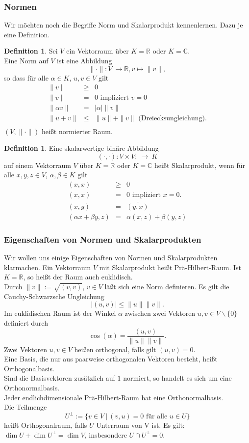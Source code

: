 \documentclass[fontsize=12pt,paper=a4,twoside,bibtotoc,idxtotoc,
liststotoc,pagesize,BCOR1.2cm,DIV15,chapterprefix,pagesize=pdftex]{scrbook}
\theoremstyle{plain}
\theoremstyle{definition}
\newtheorem{df}[equation]{Definition}
\theoremstyle{remark}
\begin{document}
\subsubsection{Normen}
Wir möchten noch die Begriffe Norm und Skalarprodukt kennenlernen. Dazu je eine Definition.
\begin{df}
Sei $V$ ein Vektorraum über $K=\mathbb{R}$ oder $K=\mathbb{C}$.\\
Eine Norm auf $V$ ist eine Abbildung
\[ \| \cdot \|: V \ \rightarrow \mathbb{R}, v \mapsto \| v \|, \]
so dass für  alle $\alpha \in K$, $u,v \in V$ gilt 
\[ \begin{array} {rcl}
\| v \| & \geq & 0 \\
\| v \| & = & 0 \mbox{ impliziert } v=0\\
\| \alpha v \| & = & | \alpha | \| v \|\\
\| u + v \| & \leq & \| u \| + \| v \| \mbox{ (Dreiecksungleichung)}.\\
\end{array} \]
$(V,\| \cdot \|)$
heißt normierter Raum.
\end{df}
\begin{df}
Eine skalarwertige binäre Abbildung
\[ ( \cdot, \cdot ): V \times V: \ \rightarrow \ K\]
auf einem Vektorraum $V$ über $K=\mathbb{R}$ oder $K=\mathbb{C}$ heißt
{\color{red} Skalarprodukt}, wenn für alle $x,y,z \in V$, $\alpha, \beta \in
K$ gilt 
\begin{eqnarray*}
(x,x) & \geq & 0\\
(x,x) & = & 0 \mbox{ impliziert } x=0.\\
(x,y) & = & \overline{(y,x)}\\
(\alpha x+\beta y,z) & = & \alpha (x,z)+ \beta (y,z)
\end{eqnarray*}
\end{df}
\subsubsection{Eigenschaften von Normen und Skalarprodukten}
Wir wollen uns einige Eigenschaften von Normen und Skalarprodukten klarmachen. Ein Vektorraum $V$ mit Skalarprodukt heißt Prä-Hilbert-Raum. Ist
$K=\mathbb{R}$, so heißt der Raum auch euklidisch.\\
Durch $\|v\|:=\sqrt{(v,v)}$, $v \in V$ läßt sich eine Norm definieren. Es gilt die Cauchy-Schwarzsche Ungleichung
\[ |(u,v)| \leq \| u \| \|v\|. \]
 Im euklidischen Raum ist der Winkel $\alpha$ zwischen zwei Vektoren
$u,v \in V\smallsetminus \{ 0 \}$ definiert durch
\[ \cos(\alpha) = \frac{(u,v)}{\|u\| \|v \|}. \]
Zwei Vektoren $u,v\in V$ heißen orthogonal, falls gilt $(u,v)=0$.\\
Eine Basis, die nur aus paarweise orthogonalen Vektoren besteht, heißt Orthogonalbasis.\\
Sind die Basisvektoren zusätzlich auf $1$ normiert, so handelt es sich um eine Orthonormalbasis.\\
Jeder endlichdimensionale Prä-Hilbert-Raum hat eine Orthonormalbasis.\\ 
Die Teilmenge 
\[
{U}^\perp := \{ v \in V \ | \ (v,u)=0 \mbox{ für alle } u \in U \}
\]
heißt Orthogonalraum, falls $U$ Unterraum von V ist.
Es gilt: $\dim U + \dim U^\perp = \dim V$, insbesondere $U \cap U^\perp = 0$.
\end{document}
